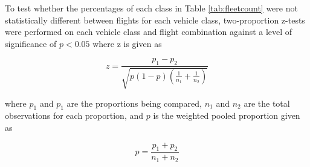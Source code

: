 \documentclass[preprint,12pt,a4paper]{elsarticle}
\begin{document}
\begin{linenumbers}
\begin{table}[H]
\centering
\caption{Fleet composition from each flight.}
\label{tab:fleetcount}
\end{table}

To test whether the percentages of each class in Table \ref{tab:fleetcount} were not statistically different between flights for each vehicle class, two-proportion z-tests were performed on each vehicle class and flight combination against a level of significance of $p < 0.05$ where z is given as

\begin{equation}
z = \frac{p_{1}-p_{2}}{\sqrt{p(1-p)\left ( \frac{1}{n_{1}}+\frac{1}{n_{2}} \right )}}
\end{equation}

\noindent
where $p_{1}$ and $p_{1}$ are the proportions being compared, $n_{1}$ and $n_{2}$ are the total observations for each proportion, and $p$ is the weighted pooled proportion given as

\begin{equation}
p = \frac{p_{1}+p_{2}}{n_{1}+n_{2}}
\end{equation}


\end{linenumbers}
\end{document}
